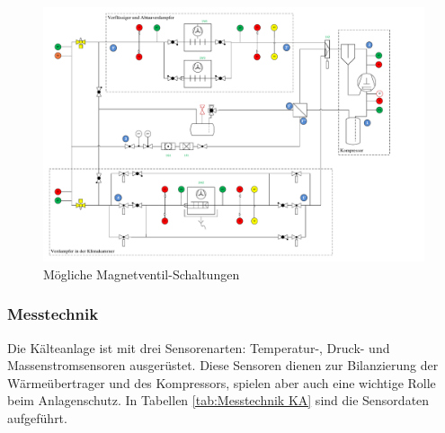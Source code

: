 \begin{figure}%
\centering		
\hspace{2cm}\includegraphics[page={3},width=1.15\textwidth]{Pictures/Schaltschema.pdf}
\caption{Mögliche Magnetventil-Schaltungen}
\label{fig:Magnetventil}
\end{figure}

\subsubsection*{Messtechnik}
\label{subsubsec:Messtechnik}

Die Kälteanlage ist mit drei Sensorenarten: Temperatur-, Druck- und Massenstromsensoren ausgerüstet. Diese Sensoren dienen zur Bilanzierung der Wärmeübertrager und des Kompressors, spielen aber auch eine wichtige Rolle beim Anlagenschutz. In Tabellen \ref{tab:Messtechnik KA} sind die Sensordaten aufgeführt. 



